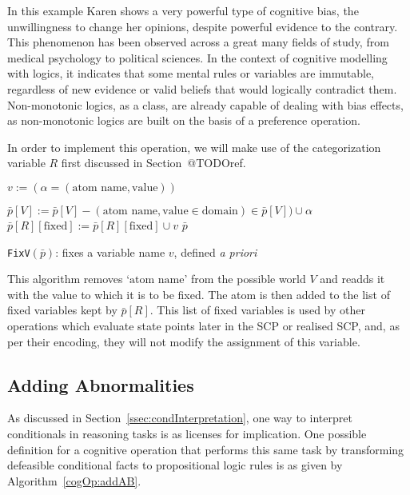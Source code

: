 In this example Karen shows a very powerful type of cognitive bias, the unwillingness to change her opinions, despite powerful evidence to the contrary. This phenomenon has been observed across a great many fields of study, from medical psychology \citep{brown2010omission} \citep{wroe2005feeling} to political sciences\citep{tappin2017heart}. In the context of cognitive modelling with logics, it indicates that some mental rules or variables are immutable, regardless of new evidence or valid beliefs that would logically contradict them. Non-monotonic logics, as a class, are already capable of dealing with bias effects, as non-monotonic logics are built on the basis of a preference operation.

In order to implement this operation, we will make use of the categorization variable $R$ first discussed in Section~@TODOref.

\begin{algorithm}[H] \label{cogOp:addV}
\SetAlgoLined
{}
$v:= (\alpha = (\text{atom name}, \text{value}))$\;

{
$\bar{p}[V]:=\bar{p}[V] - (\text{atom name}, \text{value} \in \text{domain}) \in \bar{p}[V]) \cup \alpha$\;
$\bar{p}[R][\text{fixed}]:= \bar{p}[R][\text{fixed}] \cup v$\;
\Return $\bar{p}$
}

\caption{\texttt{FixV}$(\bar{p})$: fixes a variable name $v$, defined \textit{a priori}}
\end{algorithm}


This algorithm removes `$\text{atom name}$' from the possible world $V$ and readds it with the value to which it is to be fixed. The atom is then added to the list of fixed variables kept by $\bar{p}[R]$. This list of fixed variables is used by other operations which evaluate state points later in the SCP or realised SCP, and, as per their encoding, they will not modify the assignment of this variable.

\subsection{Adding Abnormalities}

As discussed in Section~\ref{ssec:condInterpretation}, one way to interpret conditionals in reasoning tasks is as licenses for implication. One possible definition for a cognitive operation that performs this same task by transforming defeasible conditional facts to propositional logic rules is as given by Algorithm~\ref{cogOp:addAB}.

